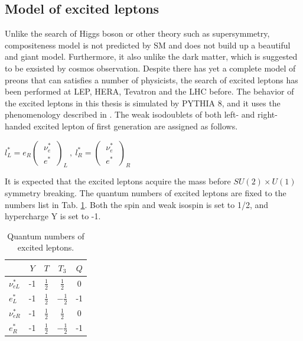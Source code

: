 \subsection{Model of excited leptons}
Unlike the search of Higgs boson or other theory such as supersymmetry, compositeness model is not predicted by SM and does not build up a beautiful and giant model. Furthermore, it also unlike the dark matter, which is 
suggested to be exsisted by cosmos observation. Despite there has yet a complete model of preons that can satisfies a number of physicists, the search of excited leptons has been performed at
LEP, HERA, Tevatron and the LHC before\cite{tevatron1, tevatron2, tevatron3, tevatron4, EXO-10-016, an-11-452, an-12-013, atlas2011-limit}. The behavior of the excited leptons in this thesis is simulated 
by PYTHIA 8\cite{Sjostrand:2006za}, and it uses the phenomenology described in \cite{compositeness}. 
\newline
The weak isodoublets of both left- and right-handed excited lepton of first generation are assigned as follows.

\begin{center}
$l^{*}_{L} = e_{R}\left(
\begin{aligned}
~\nu^{*}_{e}~ \\
~e^{*}~
\end{aligned}
\right)_{L}
 ~,~ 
l^{*}_{R} = \left(
\begin{aligned}
~\nu^{*}_{e}~ \\
~e^{*}~
\end{aligned}
\right)_{R}
 $
\end{center}   
It is expected that the excited leptons acquire the mass before $SU(2)\times U(1)$ symmetry breaking. The quantum numbers of excited leptons are fixed to the numbers list in Tab. \ref{tab:qn}.
Both the spin and weak isospin is set to 1/2, and hypercharge Y is set to -1.

\begin{table}[h!]
 \renewcommand{\arraystretch}{2}
 \addtolength{\tabcolsep}{5pt}
\begin{center}
\begin{tabular}{lcccc}
\hline 
\hline
 & $Y$ & $T$ & $T_{3}$ & $Q$ \\ 
\hline
$\nu_{e L}^{*}$ & -1 & $\frac{1}{2}$ & $\frac{1}{2}$ & 0 \\ 
$e^{*}_{L}$ & -1 & $\frac{1}{2}$ & $-\frac{1}{2}$ & -1 \\ 
$\nu_{e R}^{*}$ & -1 & $\frac{1}{2}$ & $\frac{1}{2}$ & 0 \\ 
$e^{*}_{R}$ & -1 & $\frac{1}{2}$ & $-\frac{1}{2}$ & -1 \\ 
\hline
\hline
\end{tabular}
\end{center}
\caption{\label{tab:qn}Quantum numbers of excited leptons.}
\end{table}


